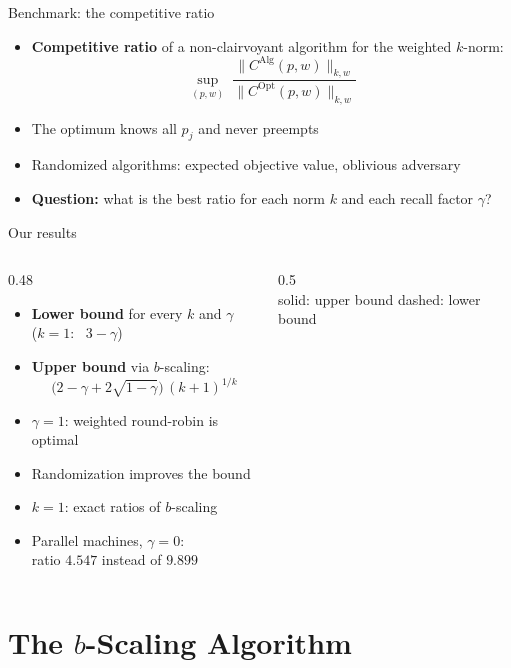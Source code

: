 \documentclass[aspectratio=169,11pt]{beamer}
\newcommand{\norm}[1]{\lVert #1 \rVert}
\newcommand{\Alg}{\mathrm{Alg}}
\newcommand{\Opt}{\mathrm{Opt}}
\begin{document}
\begin{frame}{Benchmark: the competitive ratio}
  \begin{itemize}
    \item \textbf{Competitive ratio} of a non-clairvoyant algorithm for the weighted $k$-norm:
      \[ \sup_{(p,w)} \; \frac{\norm{C^{\Alg}(p,w)}_{k,w}}{\norm{C^{\Opt}(p,w)}_{k,w}} \]
    \item The optimum knows all $p_j$ and never preempts
    \item Randomized algorithms: expected objective value, oblivious adversary
    \item \textbf{Question:} what is the best ratio for each norm $k$ and each recall factor $\gamma$?
  \end{itemize}
\end{frame}

\begin{frame}{Our results}
  \begin{columns}[c]
    \begin{column}{0.48\textwidth}
      \begin{itemize}
        \item \textbf{Lower bound} for every $k$ and $\gamma$\\
              ($k=1$: \ $3-\gamma$)
        \item \textbf{Upper bound} via $b$-scaling:
              \[ \bigl(2-\gamma+2\sqrt{1-\gamma}\bigr)\,(k+1)^{1/k} \]
        \item $\gamma = 1$: weighted round-robin is \alert{optimal}
        \item Randomization improves the bound
        \item $k=1$: \alert{exact} ratios of $b$-scaling
        \item Parallel machines, $\gamma = 0$:\\ ratio $4.547$ instead of $9.899$
      \end{itemize}
    \end{column}
    \begin{column}{0.5\textwidth}
      \centering
      \\[-2pt]
      {\footnotesize\color{ztgray} solid: upper bound \quad dashed: lower bound}
    \end{column}
  \end{columns}
\end{frame}

\section[\texorpdfstring{$b$}{b}-Scaling]{The \texorpdfstring{$b$}{b}-Scaling Algorithm}
\end{document}
